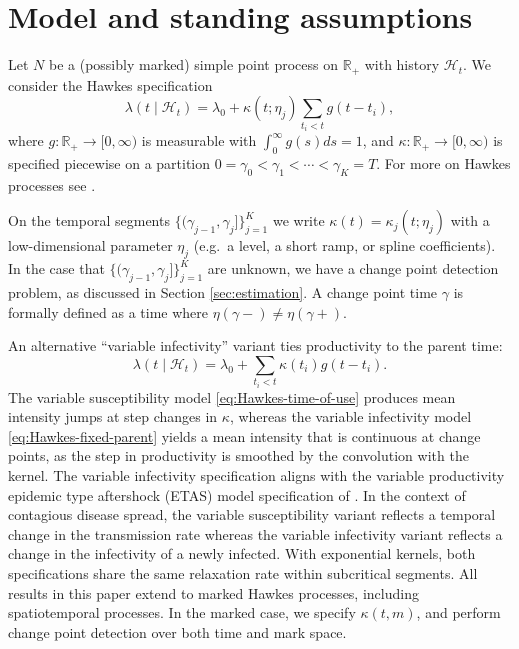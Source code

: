 \documentclass{article}
\theoremstyle{plain}
\theoremstyle{definition}
\newcommand{\R}{\mathbb{R}}
\newcommand{\1}{\mathbf{1}}
\begin{document}
    
    \section{Model and standing assumptions}
    \label{sec:model}
    
    Let $N$ be a (possibly marked) simple point process on $\R_+$ with history $\mathcal H_t$. We consider the Hawkes specification
    \begin{equation}
    \label{eq:Hawkes-time-of-use}
    \lambda(t\mid \mathcal H_t)=\lambda_0  + \kappa(t;\eta_j)\sum_{t_i<t} g(t-t_i),
    \end{equation}
    where $g:\R_+\to[0,\infty)$ is measurable with $\int_0^\infty g(s) ds=1$, and $\kappa:\R_+\to[0,\infty)$ is specified piecewise on a partition $0=\gamma_0<\gamma_1<\cdots<\gamma_K=T$.  For more on Hawkes processes see \cite{daley2003introduction,hawkes1971spectra,hawkes1974cluster,reinhart2018review}.
    
    On the temporal segments $\{(\gamma_{j-1},\gamma_j]\}_{j=1}^K$ we write $\kappa(t)=\kappa_j(t;\eta_j)$ with a low-dimensional parameter $\eta_j$ (e.g.\ a level, a short ramp, or spline coefficients). In the case that $\{(\gamma_{j-1},\gamma_j]\}_{j=1}^K$ are unknown, we have a change point detection problem, as discussed in Section \ref{sec:estimation}. A change point time $\gamma$ is formally defined as a time where $\eta(\gamma-)\neq\eta(\gamma+)$.
    
    An alternative ``variable infectivity'' variant ties productivity to the parent time:
    \begin{equation}
    \label{eq:Hawkes-fixed-parent}
    \lambda(t\mid \mathcal H_t)=\lambda_0 +\sum_{t_i<t}\kappa(t_i) g(t-t_i).
    \end{equation}
    The variable susceptibility model \eqref{eq:Hawkes-time-of-use} produces mean intensity jumps at step changes in $\kappa$, whereas the variable infectivity model \eqref{eq:Hawkes-fixed-parent} yields a mean intensity that is continuous at change points, as the step in productivity is smoothed by the convolution with the kernel. The variable infectivity specification aligns with the variable productivity epidemic type aftershock (ETAS) model specification of \cite{harte2014etas}. In the context of contagious disease spread, the variable susceptibility variant reflects a temporal change in the transmission rate whereas the variable infectivity variant reflects a change in the infectivity of a newly infected.  With exponential kernels, both specifications share the same relaxation rate within subcritical segments. %
    All results in this paper extend to marked Hawkes processes, including spatiotemporal processes. In the marked case, we specify $\kappa(t,m)$, and perform change point detection over both time and mark space.
    
\end{document}
